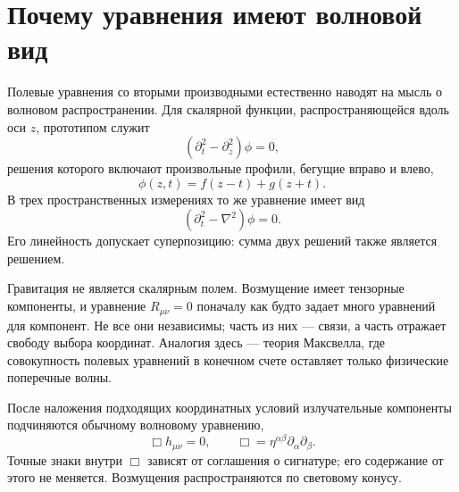 \begin{classroomqa}
\end{classroomqa}

\section{Почему уравнения имеют волновой вид}

Полевые уравнения со вторыми производными естественно наводят на мысль о волновом распространении. Для скалярной функции, распространяющейся вдоль оси \(z\), прототипом служит
\begin{equation}
 \left(\partial_t^2-\partial_z^2\right)\phi=0,
\end{equation}
решения которого включают произвольные профили, бегущие вправо и влево,
\begin{equation}
 \phi(z,t)=f(z-t)+g(z+t).
\end{equation}
В трех пространственных измерениях то же уравнение имеет вид
\begin{equation}
 \left(\partial_t^2-\nabla^2\right)\phi=0.
\end{equation}
Его линейность допускает суперпозицию: сумма двух решений также является решением.

Гравитация не является скалярным полем. Возмущение имеет тензорные компоненты, и уравнение \(R_{\mu\nu}=0\) поначалу как будто задает много уравнений для компонент. Не все они независимы; часть из них — связи, а часть отражает свободу выбора координат. Аналогия здесь — теория Максвелла, где совокупность полевых уравнений в конечном счете оставляет только физические поперечные волны.

После наложения подходящих координатных условий излучательные компоненты подчиняются обычному волновому уравнению,
\begin{equation}
 \Box h_{\mu\nu}=0,
 \qquad
 \Box=\eta^{\alpha\beta}\partial_\alpha\partial_\beta.
 \label{eq:linear-wave}
\end{equation}
Точные знаки внутри \(\Box\) зависят от соглашения о сигнатуре; его содержание от этого не меняется. Возмущения распространяются по световому конусу.


